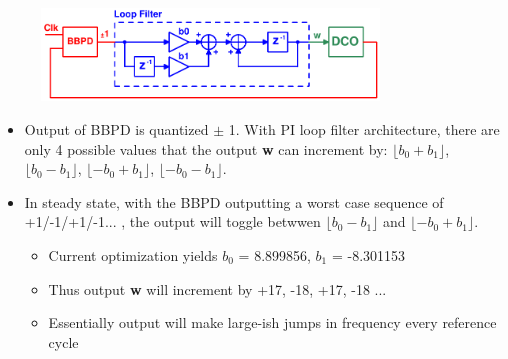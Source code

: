 		\begin{figure}
			\includegraphics[width=0.8\textwidth, angle=0]{./figs/simplified_bbpll}
		\end{figure}
		\begin{itemize}[itemsep=4pt,label=\protect---]

			\item Output of BBPD is quantized $\pm$ 1. With PI loop filter architecture, there are only 4 possible values that the output {\color{teal}\textbf{w}} can increment by: $\lfloor b_0+b_1 \rfloor$, $\lfloor b_0-b_1 \rfloor$, $\lfloor -b_0+b_1 \rfloor$, $\lfloor -b_0-b_1 \rfloor$.
			\item In steady state, with the BBPD outputting a worst case sequence of +1/-1/+1/-1... , the output will toggle betwwen $\lfloor b_0-b_1 \rfloor$ and $\lfloor -b_0+b_1 \rfloor$.
			\begin{itemize}[itemsep=4pt,label=\protect$\bullet$]
				\item Current optimization yields $b_0$ = 8.899856, $b_1$ = -8.301153 
				\item Thus output {\color{teal}\textbf{w}} will increment by +17, -18, +17, -18 ...
				\item Essentially output will make large-ish jumps in frequency every reference cycle
			\end{itemize}
		\end{itemize}

